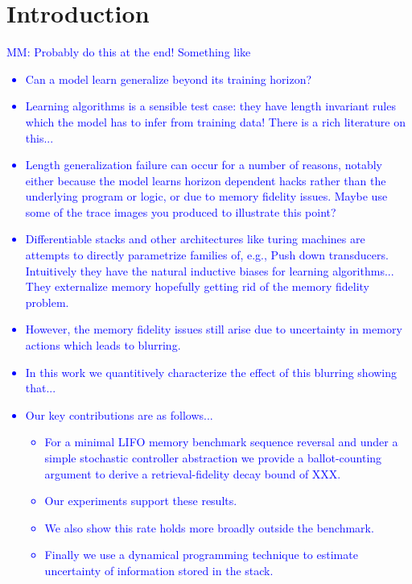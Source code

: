 \documentclass[10pt]{article} %
\newcommand{\mm}[1]{\textcolor{blue}{MM: #1}}
\begin{document}
\section{Introduction}
\mm{
Probably do this at the end! Something like
\begin{itemize}
    \item Can a model learn generalize beyond its training horizon?
    \item Learning algorithms is a sensible test case: they have length invariant rules which the model has to infer from training data! There is a rich literature on this...
    \item Length generalization failure can occur for a number of reasons, notably either because the model learns horizon dependent hacks rather than the underlying program or logic, or due to memory fidelity issues. Maybe use some of the trace images you produced to illustrate this point?
    \item Differentiable stacks and other architectures like turing machines are attempts to directly parametrize families of, e.g., Push down transducers. Intuitively they have the natural inductive biases for learning algorithms... They externalize memory hopefully getting rid of the memory fidelity problem.
    \item However, the memory fidelity issues still arise due to uncertainty in memory actions which leads to blurring.
    \item In this work we quantitively characterize the effect of this blurring showing that...
    \item Our key contributions are as follows...
    \begin{itemize}
        \item For a minimal LIFO memory benchmark sequence reversal and under a simple stochastic controller abstraction we provide a ballot-counting argument to derive a retrieval-fidelity decay bound of XXX. 
        \item Our experiments support these results.
        \item We also show this rate holds more broadly outside the benchmark.
        \item Finally we use a dynamical programming technique to estimate uncertainty of information stored in the stack.
    \end{itemize}
\end{itemize}
}
\end{document}
